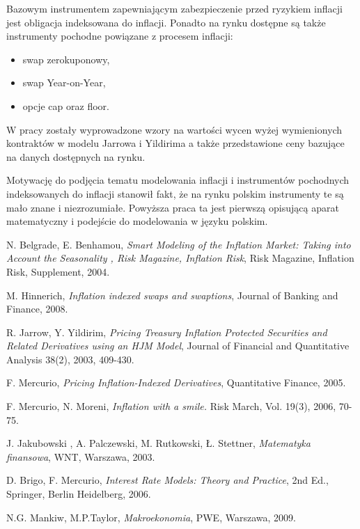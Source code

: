 \documentclass{mini}
\theoremstyle{mythstyle}
\begin{document}
Bazowym instrumentem zapewniającym zabezpieczenie przed ryzykiem inflacji jest obligacja indeksowana do inflacji. Ponadto na rynku dostępne są także instrumenty pochodne powiązane z procesem inflacji:
\begin{itemize}
	\item swap zerokuponowy,
	\item swap Year-on-Year,
	\item opcje cap oraz floor.
\end{itemize}
W pracy zostały wyprowadzone wzory na wartości wycen wyżej wymienionych kontraktów w modelu Jarrowa i Yildirima a także przedstawione ceny bazujące na danych dostępnych na rynku. 

Motywację do podjęcia tematu modelowania inflacji i instrumentów pochodnych indeksowanych do inflacji stanowił fakt, że na rynku polskim instrumenty te są mało znane i niezrozumiałe. Powyższa praca ta jest pierwszą opisującą aparat matematyczny i podejście do modelowania w języku polskim.

\begin{thebibliography}{11}
	 N. Belgrade, E. Benhamou, \emph{Smart Modeling of the Inflation Market: Taking into Account the Seasonality , Risk Magazine, Inflation Risk}, Risk Magazine, Inflation Risk, Supplement, 2004.
	
	 M. Hinnerich, \emph{Inflation indexed swaps and swaptions}, Journal of Banking and Finance, 2008.
	
	 R. Jarrow, Y. Yildirim, \emph{Pricing Treasury Inflation Protected Securities and Related Derivatives using an HJM Model}, Journal of Financial and Quantitative Analysis 38(2), 2003, 409-430.
	
		F. Mercurio, \emph{Pricing Inflation-Indexed Derivatives}, Quantitative Finance, 2005.
	
	F. Mercurio, N. Moreni, \emph{Inflation with a smile.} Risk March, Vol. 19(3), 2006, 70-75.
	
	J. Jakubowski , A. Palczewski, M. Rutkowski, Ł. Stettner,  \emph{Matematyka finansowa}, WNT, Warszawa, 2003.
	
	 D. Brigo, F. Mercurio, \emph{Interest Rate Models: Theory and Practice}, 2nd Ed., Springer, Berlin Heidelberg, 2006.
	
	 N.G. Mankiw, M.P.Taylor, \emph{Makroekonomia}, PWE, Warszawa, 2009.
	
		
\end{thebibliography}
\end{document}
